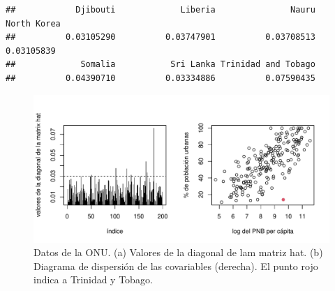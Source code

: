 \documentclass[
]{article}
\newenvironment{Shaded}{\begin{snugshade}}{\end{snugshade}}
\newcommand{\AttributeTok}[1]{\textcolor[rgb]{0.13,0.29,0.53}{#1}}
\newcommand{\DecValTok}[1]{\textcolor[rgb]{0.00,0.00,0.81}{#1}}
\newcommand{\FunctionTok}[1]{\textcolor[rgb]{0.13,0.29,0.53}{\textbf{#1}}}
\newcommand{\NormalTok}[1]{#1}
\newcommand{\SpecialCharTok}[1]{\textcolor[rgb]{0.81,0.36,0.00}{\textbf{#1}}}
\newcommand{\StringTok}[1]{\textcolor[rgb]{0.31,0.60,0.02}{#1}}
\begin{document}
\begin{verbatim}
##            Djibouti             Liberia               Nauru         North Korea 
##          0.03105290          0.03747901          0.03708513          0.03105839 
##             Somalia           Sri Lanka Trinidad and Tobago 
##          0.04390710          0.03334886          0.07590435
\end{verbatim}

\begin{Shaded}
\end{Shaded}

\begin{figure}

{\centering \includegraphics{MLG1_files/figure-latex/Un11Hdiag-1} 

}

\caption{Datos de la ONU. (a) Valores de la diagonal de lam matriz hat. (b) Diagrama de dispersión de las covariables (derecha). El punto rojo indica a Trinidad y Tobago.}\label{fig:Un11Hdiag}
\end{figure}
\end{document}
